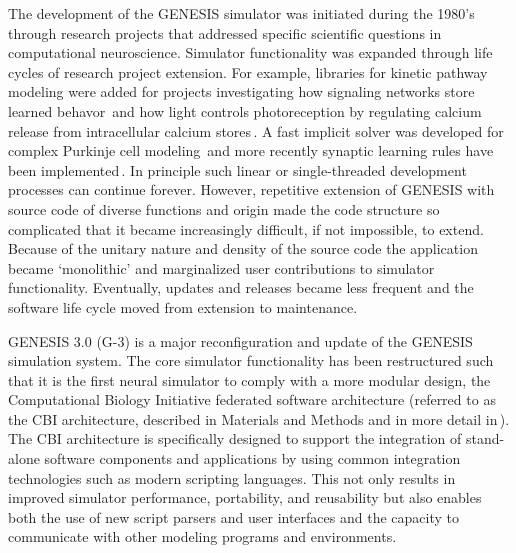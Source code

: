 \documentclass[10pt]{article}
\begin{document}
The development of the GENESIS simulator was initiated during
the 1980's through research projects that addressed specific
scientific questions in computational neuroscience. Simulator functionality was
expanded through life cycles of research project extension.
For example, libraries for kinetic pathway modeling were added for
projects investigating how signaling networks store learned
behavor\,\cite{bhalla99:_emerg} and how light controls photoreception by regulating calcium release from
intracellular calcium stores\,\cite{blackwell00:_eviden_distin_light_induc_calcium}.
A fast implicit solver was developed for
complex Purkinje cell modeling\,\cite{deschutter94:_purkin_i,
  deschutter94:_purkin_ii} and more recently synaptic learning rules
have been
implemented\,\cite{guenay08:_chann_densit_distr_explain_spikin}.  In
principle such linear or single-threaded development processes can
continue forever.  However, repetitive extension of GENESIS
with source code of diverse functions and origin
made the code structure so complicated that it became increasingly
difficult, if not impossible, to extend.  Because of the unitary nature and density of
the source code the application became `monolithic'
and marginalized user contributions to simulator functionality. 
Eventually, updates and releases became less frequent
and the software life cycle moved from extension to maintenance.


GENESIS 3.0 (G-3) is a major reconfiguration and update of the GENESIS
simulation system.  The core simulator functionality has been
restructured such that it is the first neural simulator to comply with a more modular design, the Computational 
Biology Initiative federated software architecture (referred to as the CBI
 architecture, described in Materials and Methods and in more detail in\,\cite{cornelis11:_feder_desig_neurob_simul_engin}). The CBI
architecture is specifically designed to support
the integration of stand-alone software components and applications by
using common integration technologies such as modern scripting
languages. This not only results in
improved simulator performance, portability, and reusability but also enables both the
use of new script parsers and user interfaces and the capacity
to communicate with other modeling programs and environments.
\end{document}

